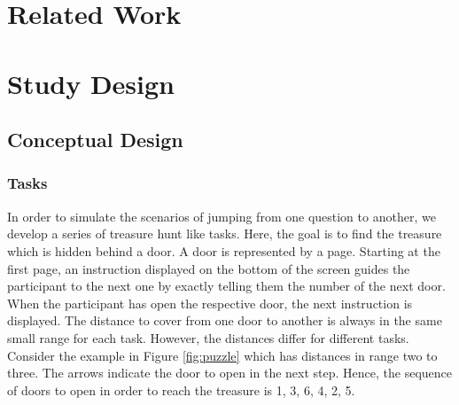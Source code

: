 \documentclass{sig-alternate-05-2015}
\begin{document}
\section{Related Work}

\section{Study Design}
\subsection{Conceptual Design}
\subsubsection{Tasks}
In order to simulate the scenarios of jumping from one question to another, we develop a series of treasure hunt like tasks. Here, the goal is to find the treasure which
is hidden behind a door. A door is represented by a page. Starting at the first page, an instruction displayed on the bottom of the screen guides the participant to the next one
by exactly telling them the number of the next door. When the participant has open the respective door, the next
instruction is displayed. The distance to cover from one door to another is always in the same small range for each task. However, the distances differ for
different tasks. Consider the example in Figure \ref{fig:puzzle} which has distances in range two to three. The arrows indicate the door to open in
the next step. Hence, the sequence of doors to open in order to reach the treasure is 1, 3, 6, 4, 2, 5.
\end{document}
